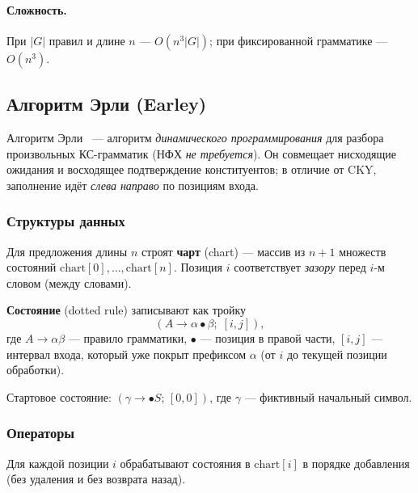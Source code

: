 \paragraph{Сложность.}
При $|G|$ правил и длине $n$ --- $O(n^3|G|)$; при фиксированной грамматике --- $O(n^3)$.

\subsection{Алгоритм Эрли (Earley)}


Алгоритм Эрли~\cite{earley1970efficient} --- алгоритм \emph{динамического программирования} для разбора произвольных КС-грамматик (НФХ \emph{не требуется}).
Он совмещает нисходящие ожидания и восходящее подтверждение конституентов; в отличие от CKY, заполнение идёт \emph{слева направо} по позициям входа.

\subsubsection{Структуры данных}

Для предложения длины $n$ строят \textbf{чарт} (chart) --- массив из $n{+}1$ множеств состояний $\mathrm{chart}[0],\ldots,\mathrm{chart}[n]$.
Позиция $i$ соответствует \emph{зазору} перед $i$-м словом (между словами).

\textbf{Состояние} (dotted rule) записывают как тройку
\[
	(A \to \alpha \bullet \beta;\; [i,j]),
\]
где $A \to \alpha\beta$ --- правило грамматики, $\bullet$ --- позиция в правой части, $[i,j]$ --- интервал входа, который уже покрыт префиксом $\alpha$ (от $i$ до текущей позиции обработки).

Стартовое состояние: $(\gamma \to \bullet S;\,[0,0])$, где $\gamma$ --- фиктивный начальный символ.

\subsubsection{Операторы}

Для каждой позиции $i$ обрабатывают состояния в $\mathrm{chart}[i]$ в порядке добавления (без удаления и без возврата назад).

